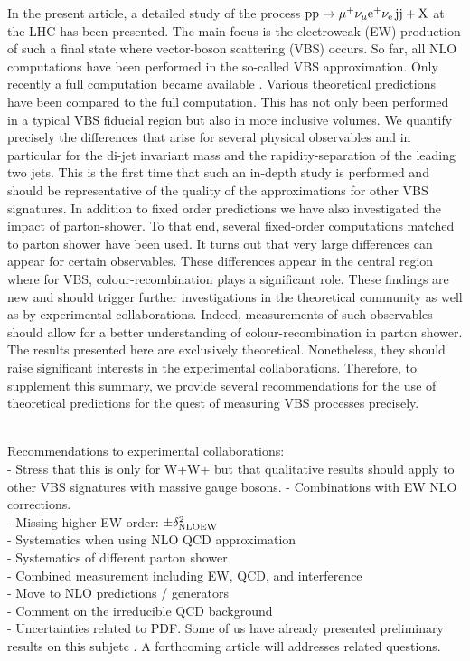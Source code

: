 In the present article, a detailed study of the process $\text{p}\text{p}\to\mu^+\nu_\mu{\rm e}^+\nu_{\rm e}\,\text{j}\text{j}+\mathrm{X}$ at the LHC has been presented.
The main focus is the electroweak (EW) production of such a final state where vector-boson scattering (VBS) occurs.
So far, all NLO computations have been performed in the so-called VBS approximation.
Only recently a full computation became available \cite{Biedermann:2017bss}.
Various theoretical predictions have been compared to the full computation.
This has not only been performed in a typical VBS fiducial region but also in more inclusive volumes.
We quantify precisely the differences that arise for several physical observables and in particular for the di-jet invariant mass and the rapidity-separation of the leading two jets.
This is the first time that such an in-depth study is performed and should be representative of the quality of the approximations for other VBS signatures.
In addition to fixed order predictions we have also investigated the impact of parton-shower.
To that end, several fixed-order computations matched to parton shower have been used.
It turns out that very large differences can appear for certain observables.
These differences appear in the central region where for VBS, colour-recombination plays a significant role.
These findings are new and should trigger further investigations in the theoretical community as well as by experimental collaborations.
Indeed, measurements of such observables should allow for a better understanding of colour-recombination in parton shower.
The results presented here are exclusively theoretical.
Nonetheless, they should raise significant interests in the experimental collaborations.
Therefore, to supplement this summary, we provide several recommendations for the use of theoretical predictions for the quest of measuring VBS processes precisely.


 \\
Recommendations to experimental collaborations: \\
- Stress that this is only for W+W+ but that qualitative results should apply to other VBS signatures with massive gauge bosons.
- Combinations with EW NLO corrections. \\
- Missing higher EW order: $\pm \delta^2_{\rm NLO EW}$ \\
- Systematics when using NLO QCD approximation \\
- Systematics of different parton shower \\
- Combined measurement including  EW, QCD, and interference \\
- Move to NLO predictions / generators \\
- Comment on the irreducible QCD background \\
- Uncertainties related to PDF.
Some of us have already presented preliminary results on this subjetc \cite{}. %
A forthcoming article will addresses related questions.